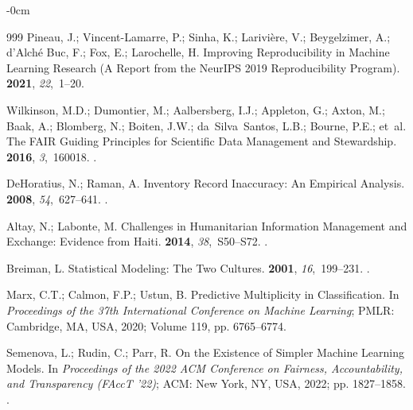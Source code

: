 \documentclass[systems,article,accept,moreauthors,pdftex]{Definitions/mdpi}
\begin{document}
\begin{adjustwidth}{-\extralength}{0cm}
\begin{thebibliography}{999}
Pineau, J.; Vincent-Lamarre, P.; Sinha, K.; Larivi{\`e}re, V.; Beygelzimer, A.;
  d'Alch{\'e} Buc, F.; Fox, E.; Larochelle, H.
\newblock Improving Reproducibility in Machine Learning Research (A Report from
  the {NeurIPS} 2019 Reproducibility Program).
 {\bf 2021}, {\em
  22},~1--20.

Wilkinson, M.D.; Dumontier, M.; Aalbersberg, I.J.; Appleton, G.; Axton, M.;
  Baak, A.; Blomberg, N.; Boiten, J.W.; da~Silva~Santos, L.B.; Bourne, P.E.;
  et~al.
\newblock The {FAIR} Guiding Principles for Scientific Data Management and
  Stewardship.
 {\bf 2016}, {\em 3},~160018.
.

DeHoratius, N.; Raman, A.
\newblock Inventory Record Inaccuracy: An Empirical Analysis.
 {\bf 2008}, {\em 54},~627--641.
.

Altay, N.; Labonte, M.
\newblock Challenges in Humanitarian Information Management and Exchange:
  Evidence from {Haiti}.
 {\bf 2014}, {\em 38},~S50--S72.
.

Breiman, L.
\newblock Statistical Modeling: The Two Cultures.
 {\bf 2001}, {\em 16},~199--231.
.

Marx, C.T.; Calmon, F.P.; Ustun, B.
\newblock Predictive Multiplicity in Classification.
\newblock In \emph{Proceedings of the 37th International
  Conference on Machine Learning}; PMLR: Cambridge, MA, USA,  2020; Volume 119, pp. 6765--6774.

Semenova, L.; Rudin, C.; Parr, R.
\newblock On the Existence of Simpler Machine Learning Models.
\newblock In \emph{Proceedings of the  2022 ACM Conference on
  Fairness, Accountability, and Transparency (FAccT '22)}; ACM: New York, NY, USA,
  2022; pp. 1827--1858.
.


\end{thebibliography}
\end{adjustwidth}
\end{document}
